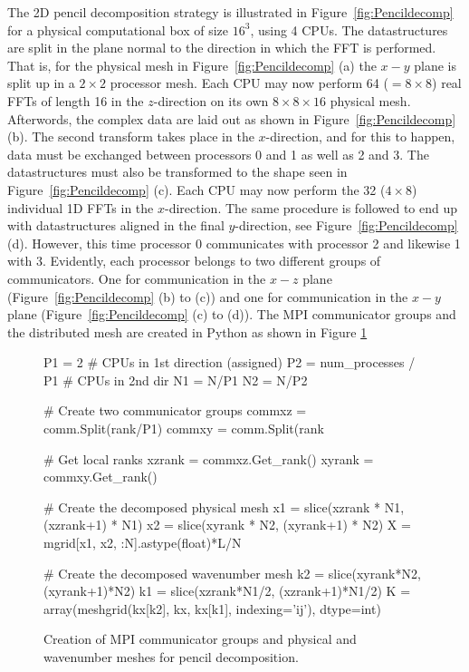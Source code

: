 \documentclass[final,3p,times,twocolumn]{elsarticle}
\begin{document}
The 2D pencil decomposition strategy is illustrated in 
Figure~\ref{fig:Pencildecomp} for a physical computational box of size $16^3$, 
using 4 CPUs. The datastructures are split in the plane normal to the direction 
in which the FFT is performed. That is, for the physical mesh in 
Figure~\ref{fig:Pencildecomp} (a) the $x-y$ plane is split up in a $2\times2$ 
processor mesh. Each CPU may now perform 64 ($= 8 \times 8$) real FFTs of 
length 16 in the $z$-direction on its own $8 \times 8 \times 16$ physical mesh. 
Afterwords, the complex data are laid out as shown in 
Figure~\ref{fig:Pencildecomp} (b). The second transform takes place in the 
$x$-direction, and for this to happen, data must be exchanged between 
processors 0 and 1 as well as 2 and 3. The datastructures must also be 
transformed to the shape seen in Figure~\ref{fig:Pencildecomp} (c). Each CPU 
may now perform the 32 ($4 \times 8$) individual 1D FFTs in the $x$-direction. 
The same procedure is followed to end up with datastructures aligned in the 
final $y$-direction, see Figure~\ref{fig:Pencildecomp} (d). However, this time 
processor 0 communicates with processor 2 and likewise 1 with 3. Evidently, 
each processor belongs to two different groups of communicators. One for 
communication in the $x-z$ plane (Figure~\ref{fig:Pencildecomp} (b) to (c)) and 
one for communication in the $x-y$ plane (Figure~\ref{fig:Pencildecomp} (c) to 
(d)). The MPI communicator groups and the distributed mesh are created in 
Python as shown in Figure \ref{fig:pencil_init}

\begin{figure}
\begin{python}
P1 = 2  # CPUs in 1st direction (assigned)
P2 = num_processes / P1 # CPUs in 2nd dir
N1 = N/P1
N2 = N/P2

# Create two communicator groups
commxz = comm.Split(rank/P1)
commxy = comm.Split(rank%

# Get local ranks 
xzrank = commxz.Get_rank()
xyrank = commxy.Get_rank()

# Create the decomposed physical mesh
x1 = slice(xzrank * N1, (xzrank+1) * N1)
x2 = slice(xyrank * N2, (xyrank+1) * N2)
X = mgrid[x1, x2, :N].astype(float)*L/N

# Create the decomposed wavenumber mesh
k2 = slice(xyrank*N2, (xyrank+1)*N2)
k1 = slice(xzrank*N1/2, (xzrank+1)*N1/2)
K = array(meshgrid(kx[k2], kx, kx[k1], 
          indexing='ij'), dtype=int)
\end{python}
\caption{Creation of MPI communicator groups and physical and wavenumber meshes 
for pencil decomposition.}
\label{fig:pencil_init}
\end{figure}	
\end{document}
